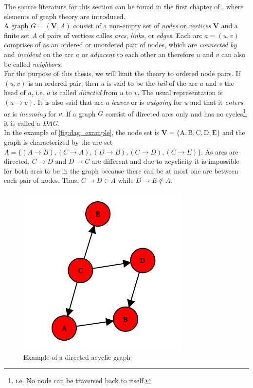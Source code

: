
The source literature for this section can be found in the first chapter of \cite{nagarajan2013bayesian}, where elements of graph theory are introduced.
\\

A graph $G=(\mathbf{V}, A)$ consist of a non-empty set of \textit{nodes} or \textit{vertices} $\bm{V}$ and a finite set $A$ of pairs of vertices calles \textit{arcs}, \textit{links}, or \textit{edges}. Each arc $a=(u, v)$ comprises of as an ordered or unordered pair of nodes, which are \textit{connected by} and \textit{incident} on the arc $a$ or \textit{adjacent} to each other an therefore $u$ and $v$ can also be called \textit{neighbors}. \\

For the purpose of this thesis, we will limit the theory to ordered node pairs. If $(u,v)$ is an ordered pair, then $u$ is said to be the \textit{tail} of the arc $a$ and $v$ the head of $a$, i.e. $a$ is called \textit{directed} from $u$ to $v$. The usual representation is $(u \rightarrow v)$. It is also said that arc $a$ \textit{leaves} or is \textit{outgoing} for $u$ and that it \textit{enters} or is \textit{incoming} for $v$. If a graph $G$ consist of directed arcs only and has no cycles\footnote{i.e. No node can be traversed back to itself.}, it is called a \textit{\ac{DAG}}. \\ In the example of \autoref{fig:dag_example}, the node set is $\mathbf{V}=\{\mathrm{A}, \mathrm{B}, \mathrm{C}, \mathrm{D}, \mathrm{E}\}$ and the graph is characterized by the arc set $A=\{(A \rightarrow B),(C \rightarrow A),(D \rightarrow B),(C \rightarrow D),(C \rightarrow E)\}$. As arcs are directed, $C \rightarrow D$ and $D \rightarrow C$ are different and due to acyclicity it is impossible for both arcs to be in the graph because there can be at most one arc between each pair of nodes. Thus, $C \rightarrow D \in A$ while $D \rightarrow E \notin A$.
\\


\begin{figure}[H]
\centering
  \includegraphics[width=0.45\linewidth]{figures/dag_example.png}
  \caption{Example of a directed acyclic graph}
  \label{fig:dag_example}
\end{figure}

